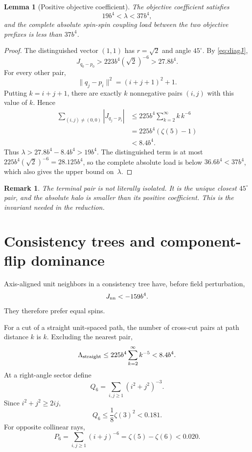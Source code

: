 \documentclass[12pt,a4paper]{article}
\newtheorem{lemma}[theorem]{Lemma}
\newtheorem{remark}[theorem]{Remark}
\newcommand{\norm}[1]{\lVert #1\rVert}
\begin{document}
\begin{lemma}[Positive objective coefficient]\label{lem:objective}
The objective coefficient satisfies
\begin{equation}\label{eq:lambda-range}
 19b^4<\lambda<37b^4,
\end{equation}
and the complete absolute spin-spin coupling load between the two objective prefixes is less than $37b^4$.
\end{lemma}

\begin{proof}
The distinguished vector $(1,1)$ has $r=\sqrt2$ and angle $45^\circ$.  By \eqref{eq:diagJ},
\[
 J_{q_0-p_0}>223b^4(\sqrt2)^{-6}>27.8b^4.
\]
For every other pair,
\[
 \norm{q_j-p_i}^2=(i+j+1)^2+1.
\]
Putting $k=i+j+1$, there are exactly $k$ nonnegative pairs $(i,j)$ with this value of $k$.  Hence
\begin{align*}
 \sum_{(i,j)\ne(0,0)}|J_{q_j-p_i}|
 &\le225b^4\sum_{k=2}^\infty k\,k^{-6}\\
 &=225b^4(\zeta(5)-1)\\
 &<8.4b^4.
\end{align*}
Thus $\lambda>27.8b^4-8.4b^4>19b^4$.  The distinguished term is at most $225b^4(\sqrt2)^{-6}=28.125b^4$, so the complete absolute load is below $36.6b^4<37b^4$, which also gives the upper bound on~$\lambda$.
\end{proof}

\begin{remark}
The terminal pair is not literally isolated.  It is the unique closest $45^\circ$ pair, and the absolute halo is smaller than its positive coefficient.  This is the invariant needed in the reduction.
\end{remark}

\section{Consistency trees and component-flip dominance}\label{sec:consistency}

Axis-aligned unit neighbors in a consistency tree have, before field perturbation,
\begin{equation}\label{eq:wire-main}
 J_{\rm nn}<-159b^4.
\end{equation}
They therefore prefer equal spins.

For a cut of a straight unit-spaced path, the number of cross-cut pairs at path distance $k$ is $k$.  Excluding the nearest pair,
\begin{equation}\label{eq:straight-tail}
 \Lambda_{\rm straight}
 \le225b^4\sum_{k=2}^\infty k^{-5}
 <8.4b^4.
\end{equation}
At a right-angle sector define
\begin{equation}\label{eq:Qsum}
 Q_6=\sum_{i,j\ge1}(i^2+j^2)^{-3}.
\end{equation}
Since $i^2+j^2\ge2ij$,
\[
 Q_6\le\frac18\zeta(3)^2<0.181.
\]
For opposite collinear rays,
\begin{equation}\label{eq:Psum}
 P_6=\sum_{i,j\ge1}(i+j)^{-6}
 =\zeta(5)-\zeta(6)<0.020.
\end{equation}
\end{document}
